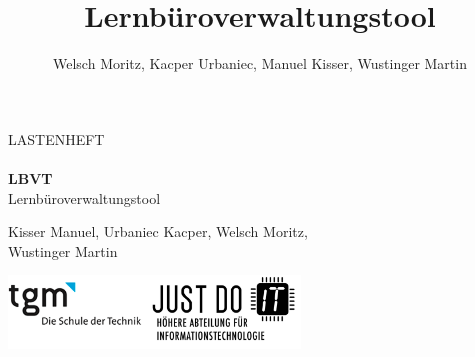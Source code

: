 \documentclass[minted, notitle]{protocol}
\title{Lernbüroverwaltungstool}
\author{Welsch Moritz, Kacper Urbaniec, Manuel Kisser, Wustinger Martin}
\begin{document}
\begin{titlepage} %
	\raggedleft %
	
	\begingroup \color{gray}{\rule{3pt}{\textheight}} \endgroup %
	\hspace{0.05\textwidth} %
	\parbox[b]{0.75\textwidth}{ %
		{{\fontsize{27}{48} \selectfont  LASTENHEFT}} \\	\vspace{0.284\textheight} \\
		{{\fontsize{65}{48} \bfseries \color{LimeGreen} LBVT}} \\[0.5\baselineskip] %
		{{\fontsize{20}{48} \selectfont Lernbüroverwaltungstool}} \\ [0.5\baselineskip] %
		{\vspace{-0.5cm}\large \begin{flushleft}Kisser Manuel, Urbaniec Kacper, Welsch Moritz, \\Wustinger Martin\end{flushleft}} %
		{\vspace{0.3cm}\includegraphics[width=220pt]{images/tgm_full.png}}
	}
\end{titlepage}

\end{document}
